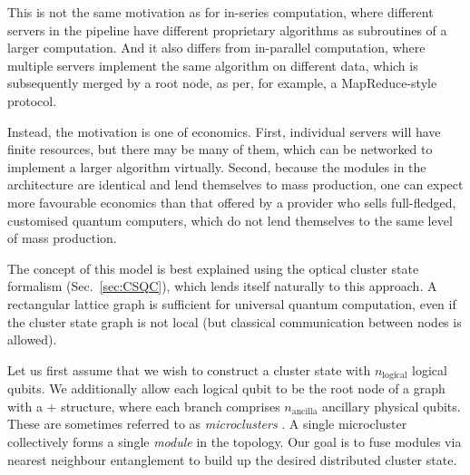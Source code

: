 \documentclass[aps,rmp,twocolumn,amsmath,amssymb,nofootinbib,superscriptaddress,longbibliography,floatfix]{revtex4-1}
\begin{document}
This is not the same motivation as for in-series computation, where different servers in the pipeline have different proprietary algorithms as subroutines of a larger computation. And it also differs from in-parallel computation, where multiple servers implement the same algorithm on different data, which is subsequently merged by a root node, as per, for example, a {\sc MapReduce}-style protocol.

Instead, the motivation is one of economics. First, individual servers will have finite resources, but there may be many of them, which can be networked to implement a larger algorithm virtually. Second, because the modules in the architecture are identical and lend themselves to mass production, one can expect more favourable economics than that offered by a provider who sells full-fledged, customised quantum computers, which do not lend themselves to the same level of mass production.

The concept of this model is best explained using the optical cluster state formalism (Sec.~\ref{sec:CSQC}), which lends itself naturally to this approach. A rectangular lattice graph is sufficient for universal quantum computation, even if the cluster state graph is not local (but classical communication between nodes is allowed).

Let us first assume that we wish to construct a cluster state with $n_\mathrm{logical}$ logical qubits. We additionally allow each logical qubit to be the root node of a graph with a $+$ structure, where each branch comprises $n_\mathrm{ancilla}$ ancillary physical qubits. These are sometimes referred to as \emph{microclusters} \cite{bib:Nielsen04}. A single microcluster collectively forms a single \emph{module} in the topology. Our goal is to fuse modules via nearest neighbour entanglement to build up the desired distributed cluster state.
\end{document}
